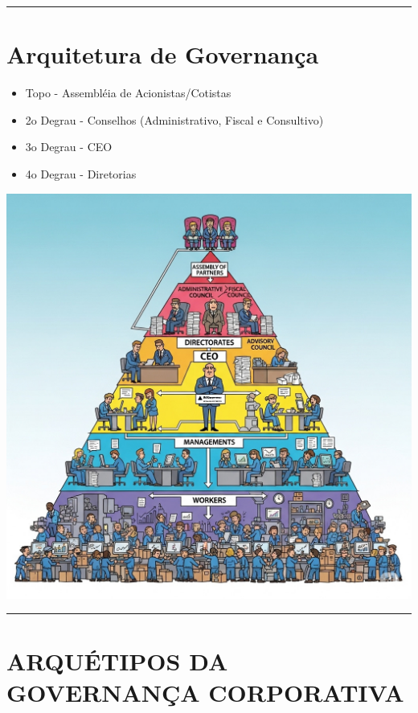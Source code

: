 \documentclass[
]{book}
\begin{document}
\begin{center}\rule{0.5\linewidth}{0.5pt}\end{center}

\section{Arquitetura de Governança}\label{arquitetura-de-governanuxe7a}

\begin{itemize}
\item
  Topo - Assembléia de Acionistas/Cotistas
\item
  2o Degrau - Conselhos (Administrativo, Fiscal e Consultivo)
\item
  3o Degrau - CEO
\item
  4o Degrau - Diretorias
\end{itemize}

\includegraphics{images/02-2025-08-12_13/00-topo_piramide.jpg}

\begin{center}\rule{0.5\linewidth}{0.5pt}\end{center}

\section{ARQUÉTIPOS DA GOVERNANÇA CORPORATIVA}\label{arquuxe9tipos-da-governanuxe7a-corporativa}
\end{document}
